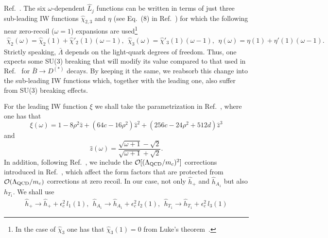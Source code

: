 \documentclass[aps,superscriptaddress,showpacs,nofootinbib,11pt]{revtex4-1}
\newcommand{\be}{\begin{equation}} \newcommand{\ee}{\end{equation}}
\newcommand{\bea}{\begin{eqnarray}} \newcommand{\eea}{\end{eqnarray}}
\begin{document}
Ref.~\cite{Bernlochner:2017jka}.  The six $\omega$-dependent $\hat L_j$ functions can be 
written in terms of just three sub-leading IW functions $\hat\chi_{2,3}$ and $\eta$ 
(see Eq.~(8) in Ref.~\cite{Bernlochner:2017jka}) for which  the  following near zero-recoil ($\omega=1$) 
expansions are used\footnote{In the case of $\hat \chi_3$ one has that $\hat\chi_3(1)=0$ from Luke's theorem~\cite{Luke:1990eg}. }
\bea
\hat\chi_2(\omega)=\hat\chi_2(1)+\hat\chi'_2(1)(\omega-1),\ \
\hat\chi_3(\omega)=\hat\chi'_3(1)(\omega-1),\ \ 
\eta(\omega)=\eta(1)+\eta'(1)(\omega-1).
\eea
 Strictly speaking, $\bar\Lambda$ depends on the light-quark degrees of freedom. Thus, one expects some SU(3) breaking
  that will modify its value compared to that used in 
 Ref.~\cite{Bernlochner:2017jka} for $\bar B\to D^{(*)}$ decays. 
 By keeping it the same, we reabsorb this change into the sub-leading IW functions which, together with the leading one, also suffer from SU(3) breaking effects.


 For the leading IW function $\xi$ we shall take the parametrization in 
 Ref.~\cite{Murgui:2019czp}, where one has that
%
\be 
\xi(\omega)=1-8\rho^2\hat z+(64c-16\rho^2)\hat z^2+(256 c-24\rho^2+512 d)\hat z^3
\ee
%
and
%
\be 
\hat z(\omega)=\frac{\sqrt{\omega+1}-\sqrt2}{\sqrt{\omega+1}+\sqrt2}.
\ee
%
In addition, following Ref.~\cite{Murgui:2019czp}, we include the 
${\cal O}[(\Lambda_{\rm QCD}/m_c)^2]$ corrections introduced in 
Ref.~\cite{Jung:2018lfu}, which affect the form factors that are protected from
${\cal O}(\Lambda_{\rm QCD}/m_c)$ corrections at zero recoil. In our case, not only  $\hat h_+$ 
and $\hat h_{A_1}$ but also $h_{T_1}$. We shall use
%
\bea
\hat h_+\to\hat h_++\epsilon_c^2\, l_1(1),\ \ \hat h_{A_1}\to\hat h_{A_1}+\epsilon_c^2\, l_2(1)
,\ \ \hat h_{T_1}\to\hat h_{T_1}+\epsilon_c^2\, l_3(1)
\eea

%
\end{document}
